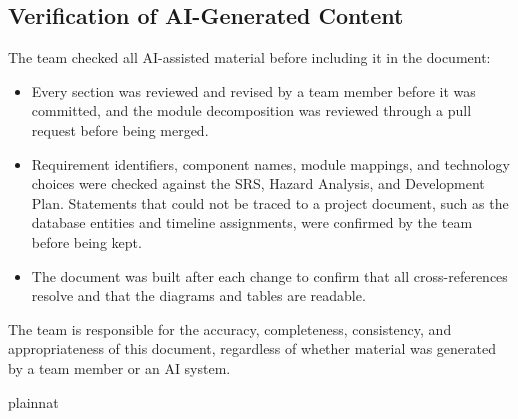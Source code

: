 \documentclass[12pt, titlepage]{article}
\begin{document}
\subsection{Verification of AI-Generated Content}

The team checked all AI-assisted material before including it in the document:
\begin{itemize}
\item Every section was reviewed and revised by a team member before it was committed, and the module decomposition was reviewed through a pull request before being merged.
\item Requirement identifiers, component names, module mappings, and technology choices were checked against the SRS, Hazard Analysis, and Development Plan. Statements that could not be traced to a project document, such as the database entities and timeline assignments, were confirmed by the team before being kept.
\item The document was built after each change to confirm that all cross-references resolve and that the diagrams and tables are readable.
\end{itemize}

The team is responsible for the accuracy, completeness, consistency, and appropriateness of this document, regardless of whether material was generated by a team member or an AI system.

\newpage{}

 {plainnat}

\end{document}
